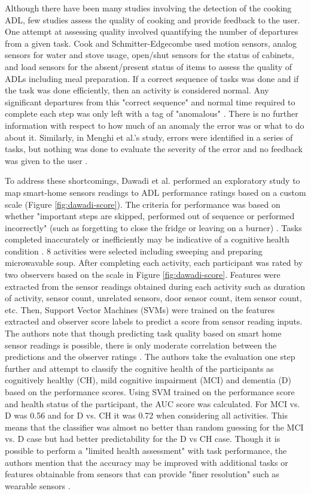 Although there have been many studies involving the detection of the cooking ADL, few studies assess the quality of cooking and provide feedback to the user. One attempt at assessing quality involved quantifying the number of departures from a given task. Cook and Schmitter-Edgecombe used motion sensors, analog sensors for water and stove usage, open/shut sensors for the status of cabinets, and load sensors for the absent/present status of items to assess the quality of ADLs including meal preparation. If a correct sequence of tasks was done and if the task was done efficiently, then an activity is considered normal. Any significant departures from this "correct sequence" and normal time required to complete each step was only left with a tag of "anomalous" \cite{cook_assessing_2009}. There is no further information with respect to how much of an anomaly the error was or what to do about it. Similarly, in Menghi et al.'s study, errors were identified in a series of tasks, but nothing was done to evaluate the severity of the error and no feedback was given to the user \cite{mokhtari_smart_2018}. 

To address these shortcomings, Dawadi et al. performed an exploratory study to map smart-home sensors readings to ADL performance ratings based on a custom scale (Figure \ref{fig:dawadi-score}). The criteria for performance was based on whether "important steps are skipped, performed out of sequence or performed incorrectly" (such as forgetting to close the fridge or leaving on a burner) \cite{dawadi_automated_2013}. Tasks completed inaccurately or inefficiently may be indicative of a cognitive health condition \cite{dawadi_automated_2013}. 8 activities were selected including sweeping and preparing microwavable soup. After completing each activity, each participant was rated by two observers based on the scale in Figure \ref{fig:dawadi-score}. Features were extracted from the sensor readings obtained during each activity such as duration of activity, sensor count, unrelated sensors, door sensor count, item sensor count, etc. Then, Support Vector Machines (SVMs) were trained on the features extracted and observer score labels to predict a score from sensor reading inputs. The authors note that though predicting task quality based on smart home sensor readings is possible, there is only moderate correlation between the predictions and the observer ratings \cite{dawadi_automated_2013}. The authors take the evaluation one step further and attempt to classify the cognitive health of the participants as cognitively healthy (CH), mild cognitive impairment (MCI) and dementia (D) based on the performance scores. Using SVM trained on the performance score and health status of the participant, the AUC score was calculated. For MCI vs. D was 0.56 and for D vs. CH it was 0.72 when considering all activities. This means that the classifier was almost no better than random guessing for the MCI vs. D case but had better predictability for the D vs CH case. Though it is possible to perform a "limited health assessment" with task performance, the authors mention that the accuracy may be improved with additional tasks or features obtainable from sensors that can provide "finer resolution" such as wearable sensors \cite{dawadi_automated_2013}.

